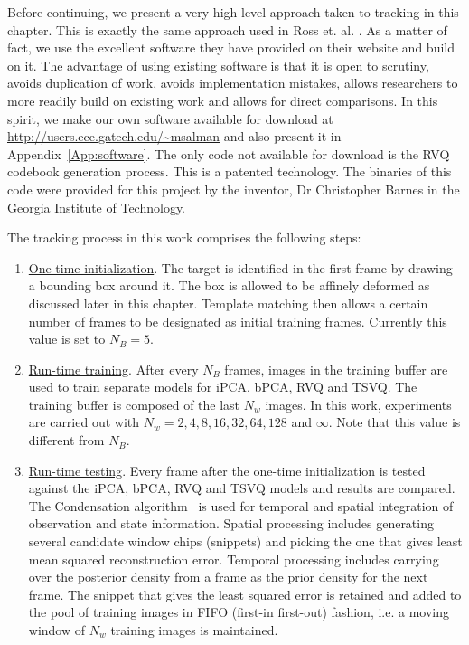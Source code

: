 Before continuing, we present a very high level approach taken to tracking in this chapter.  This is exactly the same approach used in Ross et. al. \cite{2008_JNL_subspaceTRK_Ross}.  As a matter of fact, we use the excellent software they have provided on their website \cite{2008_SFT_Ross} and build on it.  The advantage of using existing software is that it is open to scrutiny, avoids duplication of work, avoids implementation mistakes, allows researchers to more readily build on existing work and allows for direct comparisons.  In this spirit, we make our own software available for download at \url{http://users.ece.gatech.edu/~msalman} and also present it in Appendix~\ref{App:software}.  The only code not available for download is the RVQ codebook generation process.  This is a patented technology.  The binaries of this code were provided for this project by the inventor, Dr Christopher Barnes in the Georgia Institute of Technology.

The tracking process in this work comprises the following steps:

\begin{enumerate}
\item \underline{One-time initialization}.  The target is identified in the first frame by drawing a bounding box around it.  The box is allowed to be affinely deformed as discussed later in this chapter.  Template matching then allows a certain number of frames to be designated as initial training frames.  Currently this value is set to $N_B=5$. 

\item \underline{Run-time training}.  After every $N_B$ frames, images in the training buffer are used to train separate models for iPCA, bPCA, RVQ and TSVQ.  The training buffer is composed of the last $N_w$ images.  In this work, experiments are carried out with $N_w=2, 4, 8, 16, 32, 64, 128$ and $\infty$.  Note that this value is different from $N_B$.
  
\item \underline{Run-time testing}.  Every frame after the one-time initialization is tested against the iPCA, bPCA, RVQ and TSVQ models and results are compared.  The Condensation algorithm~\cite{1998_JNL_Condensation_IsardBlake} is used for temporal and spatial integration of observation and state information.  Spatial processing includes generating several candidate window chips (snippets) and picking the one that gives least mean squared reconstruction error.  Temporal processing includes carrying over the posterior density from a frame as the prior density for the next frame.  The snippet that gives the least squared error is retained and added to the pool of training images in FIFO (first-in first-out) fashion, i.e. a moving window of $N_w$ training images is maintained.
\end{enumerate}

